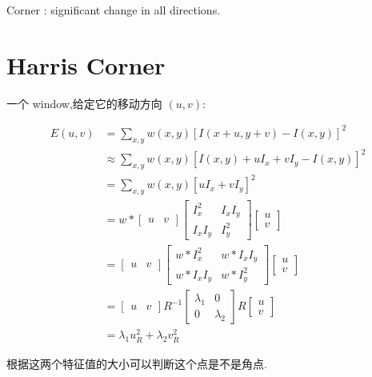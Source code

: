 Corner : significant change in all directions.

\section{Harris Corner}

一个 window,给定它的移动方向 $(u,v)$:

\begin{equation}
    \begin{aligned}
    E(u,v) &= \sum_{x,y} w(x,y) [I(x+u,y+v) - I(x,y)]^2\\
    &\approx \sum_{x,y} w(x,y) [I(x,y) + uI_x + vI_y - I(x,y)]^2\\
    &= \sum_{x,y} w(x,y) [uI_x + vI_y]^2\\
    &= w \ast \begin{bmatrix} u & v \end{bmatrix} \begin{bmatrix} I_x^2 & I_xI_y \\ I_xI_y & I_y^2 \end{bmatrix} \begin{bmatrix} u \\ v \end{bmatrix}\\
    &= \begin{bmatrix} u & v \end{bmatrix} \begin{bmatrix} w \ast I_x^2 & w \ast I_xI_y \\ w \ast I_xI_y & w \ast I_y^2 \end{bmatrix} \begin{bmatrix} u \\ v \end{bmatrix}\\
    &= \begin{bmatrix} u & v \end{bmatrix} R^{-1} \begin{bmatrix} \lambda_1 & 0\\ 0 & \lambda_2 \end{bmatrix} R \begin{bmatrix} u \\ v \end{bmatrix}\\
    &= \lambda_1 u_R^2 + \lambda_2 v_R^2
    \end{aligned}
\end{equation}

根据这两个特征值的大小可以判断这个点是不是角点.

